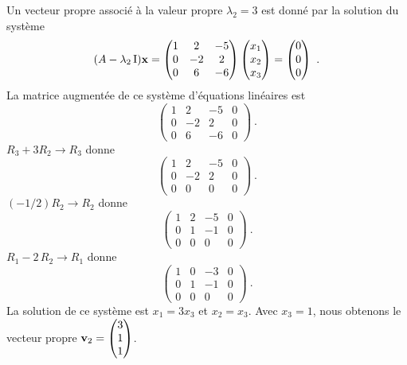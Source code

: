 {Un vecteur propre
associé à la valeur propre $\lambda_2 = 3$ est donné par la solution
du système
\[
(A-\lambda_2\operatorname{I})\mathbf{x} = 
\begin{pmatrix}
1 & 2 & -5 \\ 0 & -2 & 2 \\ 0 & 6 & -6
\end{pmatrix}
\begin{pmatrix} x_1 \\ x_2 \\ x_3 \end{pmatrix}
=
\begin{pmatrix} 0 \\ 0 \\ 0 \end{pmatrix} \ .
\]
La matrice augmentée de ce système d'équations linéaires est
\[
\left(\begin{array}{ccc|c}
1 & 2 & -5 & 0 \\ 0 & -2 & 2 & 0 \\ 0 & 6 & -6 & 0
\end{array}\right) \ .
\]
$R_3+3R_2 \rightarrow R_3$ donne
\[
\left(\begin{array}{ccc|c}
1 & 2 & -5 & 0 \\ 0 & -2 & 2 & 0 \\ 0 & 0 & 0 & 0
\end{array}\right) \ .
\]
$(-1/2)R_2 \rightarrow R_2$ donne
\[
\left(\begin{array}{ccc|c}
1 & 2 & -5 & 0 \\ 0 & 1 & -1 & 0 \\ 0 & 0 & 0 & 0
\end{array}\right) \ .
\]
$R_1-2\,R_2 \rightarrow R_1$ donne
\[
\left(\begin{array}{ccc|c}
1 & 0 & -3 & 0 \\ 0 & 1 & -1 & 0 \\ 0 & 0 & 0 & 0
\end{array}\right) \ .
\]
La solution de ce système est $x_1=3x_3$ et $x_2=x_3$.  Avec $x_3=1$,
nous obtenons le vecteur propre
$\displaystyle \mathbf{v}_2 = \begin{pmatrix} 3 \\ 1 \\ 1 \end{pmatrix}$.

}
